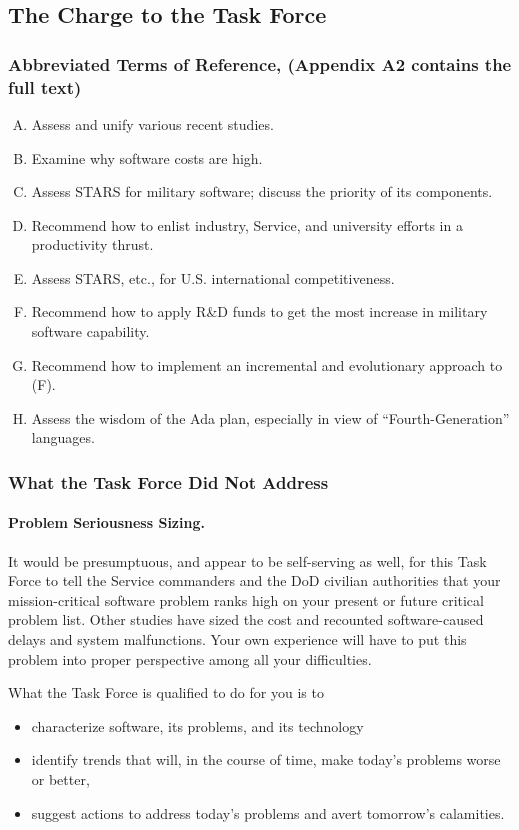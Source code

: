 \documentclass[12pt]{article}
\begin{document}
\subsection{The Charge to the Task Force}

\subsubsection*{Abbreviated Terms of Reference, (Appendix A2 contains the full text)}

\begin{enumerate}[A.]
    \item Assess and unify various recent studies.
    \item Examine why software costs are high.
    \item Assess STARS for military software; discuss the priority of its components.
    \item Recommend how to enlist industry, Service, and university efforts in a productivity thrust.
    \item Assess STARS, etc., for U.S. international competitiveness.
    \item Recommend how to apply R\&D funds to get the most increase in military software capability.
    \item Recommend how to implement an incremental and evolutionary approach to (F).
    \item Assess the wisdom of the Ada plan, especially in view of “Fourth-Generation” languages.
\end{enumerate}

\subsubsection*{What the Task Force Did Not Address}

\paragraph{Problem Seriousness Sizing.} It would be presumptuous, and appear to
be self-serving as well, for this Task Force to tell the Service commanders and
the DoD civilian authorities that your mission-critical software problem ranks
high on your present or future critical problem list. Other studies have sized
the cost and recounted software-caused delays and system malfunctions. Your own
experience will have to put this problem into proper perspective among all your
difficulties.

What the Task Force is qualified to do for you is to
\begin{itemize}
    \item characterize software, its problems, and its technology

    \item identify trends that will, in the course of time, make today's problems worse or better,

    \item suggest actions to address today's problems and avert tomorrow's calamities.
\end{itemize}
\end{document}

